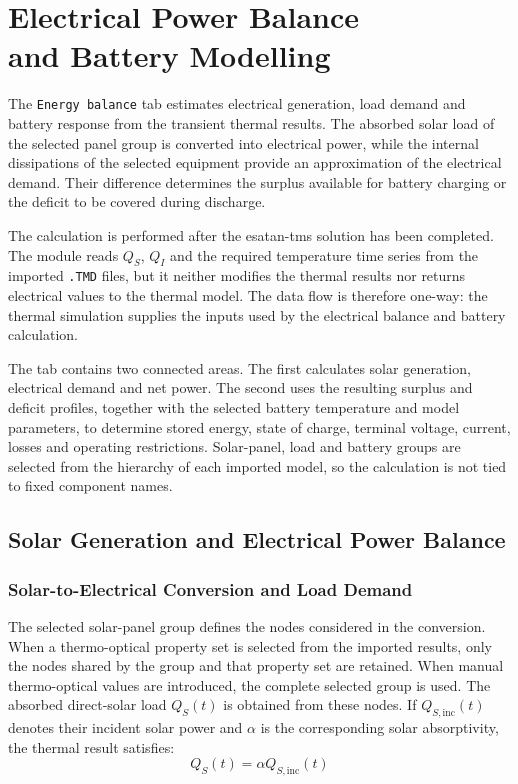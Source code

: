 \chapter[Electrical Power Balance and Battery Modelling]
{Electrical Power Balance\\and Battery Modelling}
\label{ch:electrical_battery_analysis}

The \texttt{Energy balance} tab estimates electrical generation, load demand
and battery response from the transient thermal results. The absorbed solar
load of the selected panel group is converted into electrical power, while the
internal dissipations of the selected equipment provide an approximation of
the electrical demand. Their difference determines the surplus available for
battery charging or the deficit to be covered during discharge.

The calculation is performed after the \acrshort{esatan-tms} solution has
been completed. The module reads $Q_S$, $Q_I$ and the required temperature
time series from the imported \texttt{.TMD} files, but it neither modifies the
thermal results nor returns electrical values to the thermal model. The data
flow is therefore one-way: the thermal simulation supplies the inputs used by
the electrical balance and battery calculation.

The tab contains two connected areas. The first calculates solar generation,
electrical demand and net power. The second uses the resulting surplus and
deficit profiles, together with the selected battery temperature and model
parameters, to determine stored energy, state of charge, terminal voltage,
current, losses and operating restrictions. Solar-panel, load and battery
groups are selected from the hierarchy of each imported model, so the
calculation is not tied to fixed component names.

\section{Solar Generation and Electrical Power Balance}
\label{sec:solar_electrical_balance}

\subsection{Solar-to-Electrical Conversion and Load Demand}
\label{subsec:solar_conversion_load_demand}

The selected solar-panel group defines the nodes considered in the conversion.
When a thermo-optical property set is selected from the imported results, only
the nodes shared by the group and that property set are retained.
When manual thermo-optical values are introduced, the complete selected group is used. 
The absorbed direct-solar load $Q_S(t)$ is obtained from these nodes. If $Q_{S,\mathrm{inc}}(t)$
denotes their incident solar power and $\alpha$ is the corresponding solar
absorptivity, the thermal result satisfies:
\begin{equation}
    Q_S(t)=\alpha Q_{S,\mathrm{inc}}(t)
    \label{eq:solar_absorbed_power_ch8}
\end{equation}

